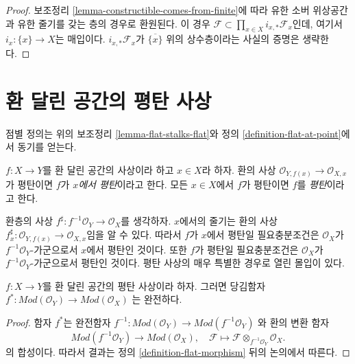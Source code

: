 \begin{proof}
보조정리 \ref{lemma-constructible-comes-from-finite}에 따라 유한 소버
위상공간과 유한 줄기를 갖는 층의 경우로 환원된다. 이 경우
$\mathcal{F} \subset \prod_{x \in X} i_{x, *}\mathcal{F}_x$인데,
여기서 $i_x : \{x\} \to X$는 매입이다. $i_{x, *}\mathcal{F}_x$가
$\overline{\{x\}}$ 위의 상수층이라는 사실의 증명은 생략한다.
\end{proof}










\section{환 달린 공간의 평탄 사상}
\label{section-flat-morphisms}

\noindent
점별 정의는 위의 보조정리 \ref{lemma-flat-stalks-flat}와
정의 \ref{definition-flat-at-point}에서 동기를 얻는다.

\begin{definition}
\label{definition-flat-morphism}
$f : X \to Y$를 환 달린 공간의 사상이라 하고 $x \in X$라 하자.
환의 사상 $\mathcal{O}_{Y, f(x)} \to \mathcal{O}_{X, x}$가 평탄이면
$f$가 {\it $x$에서 평탄}이라고 한다. 모든 $x \in X$에서 $f$가
평탄이면 $f$를 {\it 평탄}이라고 한다.
\end{definition}

\noindent
환층의 사상 $f^\sharp : f^{-1}\mathcal{O}_Y \to \mathcal{O}_X$를 생각하자.
$x$에서의 줄기는 환의 사상
$f^\sharp_x : \mathcal{O}_{Y, f(x)} \to \mathcal{O}_{X, x}$임을 알 수 있다.
따라서 $f$가 $x$에서 평탄일 필요충분조건은 $\mathcal{O}_X$가
$f^{-1}\mathcal{O}_Y$-가군으로서 $x$에서 평탄인 것이다. 또한 $f$가
평탄일 필요충분조건은 $\mathcal{O}_X$가 $f^{-1}\mathcal{O}_Y$-가군으로서
평탄인 것이다. 평탄 사상의 매우 특별한 경우로 열린 몰입이 있다.

\begin{lemma}
\label{lemma-pullback-flat}
$f : X \to Y$를 환 달린 공간의 평탄 사상이라 하자. 그러면 당김함자
$f^* : \textit{Mod}(\mathcal{O}_Y) \to \textit{Mod}(\mathcal{O}_X)$
는 완전하다.
\end{lemma}

\begin{proof}
함자 $f^*$는 완전함자
$f^{-1} : \textit{Mod}(\mathcal{O}_Y) \to \textit{Mod}(f^{-1}\mathcal{O}_Y)$
와 환의 변환 함자
$$
\textit{Mod}(f^{-1}\mathcal{O}_Y) \to \textit{Mod}(\mathcal{O}_X), \quad
\mathcal{F} \longmapsto
\mathcal{F} \otimes_{f^{-1}\mathcal{O}_Y} \mathcal{O}_X.
$$
의 합성이다. 따라서 결과는 정의 \ref{definition-flat-morphism} 뒤의
논의에서 따른다.
\end{proof}

